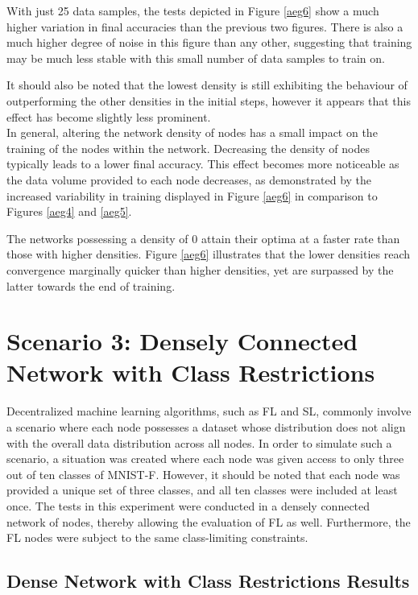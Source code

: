 With just 25 data samples, the tests depicted in Figure \ref{aeg6} show a much higher variation in final accuracies than the previous two figures. There is also a much higher degree of noise in this figure than any other, suggesting that training may be much less stable with this small number of data samples to train on.

It should also be noted that the lowest density is still exhibiting the behaviour of outperforming the other densities in the initial steps, however it appears that this effect has become slightly less prominent. \\


In general, altering the network density of nodes has a small impact on the training of the nodes within the network. Decreasing the density of nodes typically leads to a lower final accuracy. This effect becomes more noticeable as the data volume provided to each node decreases, as demonstrated by the increased variability in training displayed in Figure \ref{aeg6} in comparison to Figures \ref{aeg4} and \ref{aeg5}.

The networks possessing a density of 0 attain their optima at a faster rate than those with higher densities. Figure \ref{aeg6} illustrates that the lower densities reach convergence marginally quicker than higher densities, yet are surpassed by the latter towards the end of training.

\section{Scenario 3: Densely Connected Network with Class Restrictions}

Decentralized machine learning algorithms, such as FL and SL, commonly involve a scenario where each node possesses a dataset whose distribution does not align with the overall data distribution across all nodes. In order to simulate such a scenario, a situation was created where each node was given access to only three out of ten classes of MNIST-F. However, it should be noted that each node was provided a unique set of three classes, and all ten classes were included at least once. The tests in this experiment were conducted in a densely connected network of nodes, thereby allowing the evaluation of FL as well. Furthermore, the FL nodes were subject to the same class-limiting constraints. 

\subsection{Dense Network with Class Restrictions Results}

